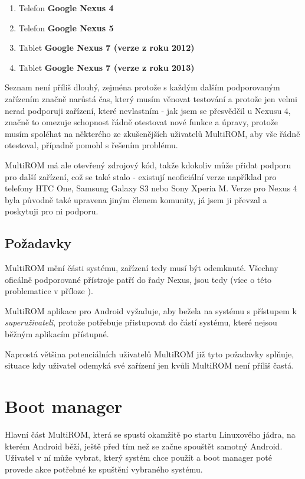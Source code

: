 \documentclass[12pt, a4paper, oneside]{article}
\newcommand{\B}{\textbf} %
\newcommand{\It}{\textit}  %
\begin{document}
\begin{enumerate}
    \item Telefon \B{Google Nexus 4}
    \item Telefon \B{Google Nexus 5}
    \item Tablet \B{Google Nexus 7 (verze z roku 2012)}
    \item Tablet \B{Google Nexus 7 (verze z roku 2013)}
\end{enumerate}

Seznam není příliš dlouhý, zejména protože s každým dalším podporovaným zařízením značně narůstá čas, který musím věnovat testování a protože jen velmi nerad podporuji zařízení, které nevlastním - jak jsem se přesvědčil u Nexusu 4, značně to omezuje schopnost řádně otestovat nové funkce a úpravy, protože musím spoléhat na některého ze zkušenějších uživatelů MultiROM, aby vše řádně otestoval, případně pomohl s řešením problému.

MultiROM má ale otevřený zdrojový kód, takže kdokoliv může přidat podporu pro další zařízení, což se také stalo - existují neoficiální verze například pro telefony HTC One, Samsung Galaxy S3 nebo Sony Xperia M. Verze pro Nexus 4 byla původně také upravena jiným členem komunity, já jsem ji převzal a poskytuji pro ni podporu.

\subsection{Požadavky}
MultiROM mění části systému, zařízení tedy musí být odemknuté. Všechny oficálně podporované přístroje patří do řady Nexus, jsou tedy  (více o této problematice v příloze ).

MultiROM aplikace pro Android vyžaduje, aby bežela na systému s přístupem k \It{superuživateli}, protože potřebuje přistupovat do částí systému, které nejsou běžným aplikacím přístupné.

Naprostá většina potenciálních uživatelů MultiROM již tyto požadavky splňuje, situace kdy uživatel odemyká své zařízení jen kvůli MultiROM není příliš častá.

\newpage
\section{Boot manager}
Hlavní část MultiROM, která se spustí okamžitě po startu Linuxového jádra, na kterém Android běží, ještě před tím než se začne spouštět samotný Android. Uživatel v ní může vybrat, který systém chce použít a boot manager poté provede akce potřebné ke spuštění vybraného systému.
\end{document}
